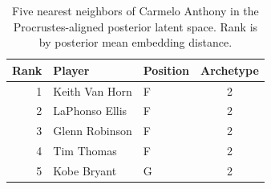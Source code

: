 \begin{table}[htbp]
  \centering\small
  \begin{tabular}{rllc}
    \toprule
    Rank & Player & Position & Archetype \\
    \midrule
    1 & Keith Van Horn & F & 2 \\
    2 & LaPhonso Ellis & F & 2 \\
    3 & Glenn Robinson & F & 2 \\
    4 & Tim Thomas & F & 2 \\
    5 & Kobe Bryant & G & 2 \\
    \bottomrule
  \end{tabular}
  \caption{Five nearest neighbors of Carmelo Anthony in the Procrustes-aligned posterior latent space. Rank is by posterior mean embedding distance.}
  \label{tab:Carmelo_Anthony_neighbors}
\end{table}

